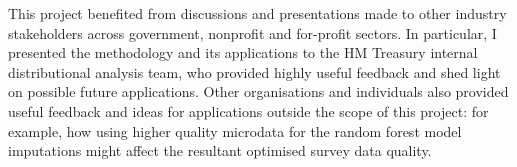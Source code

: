

This project benefited from discussions and presentations made to other industry stakeholders across government, nonprofit and for-profit sectors. In particular, I presented the methodology and its applications to the HM Treasury internal distributional analysis team, who provided highly useful feedback and shed light on possible future applications. Other organisations and individuals also provided useful feedback and ideas for applications outside the scope of this project: for example, how using higher quality microdata for the random forest model imputations might affect the resultant optimised survey data quality.